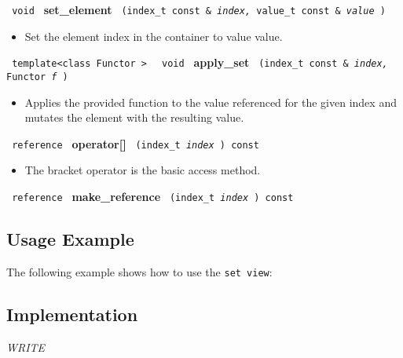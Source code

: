\noindent
\texttt{%
void
}
\newline
\textbf{set\_element}%
\texttt{%
(index\_t const \&
\textit{index,}%
value\_t const \&
\textit{value}%
)
}

\begin{itemize}
\item
Set the element index in the container to value value.
\end{itemize}

\noindent
\texttt{%
template<class Functor >
}
\texttt{%
void
}
\newline
\textbf{apply\_set}%
\texttt{%
(index\_t const \&
\textit{index,}%
Functor
\textit{f}%
)
}

\begin{itemize}
\item
Applies the provided function to the value referenced for the given index and mutates the element with the resulting value.
\end{itemize}

\noindent
\texttt{%
reference
}
\newline
\textbf{operator[]}%
\texttt{%
(index\_t
\textit{index}%
) const
}

\begin{itemize}
\item
The bracket operator is the basic access method.
\end{itemize}

\noindent
\texttt{%
reference
}
\newline
\textbf{make\_reference}%
\texttt{%
(index\_t
\textit{index}%
) const
}

\subsection{Usage Example} \label{sec-set-vw-use}

The following example shows how to use the \texttt{set view}:


\subsection{Implementation} \label{sec-set-vw-impl}

\textit{WRITE}


